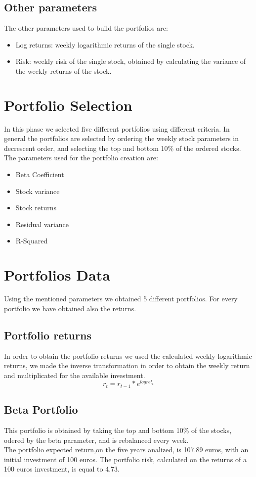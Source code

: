 \documentclass[12pt, a4paper, twocolumn]{article} %
\begin{document}
	\subsection{Other parameters}
	The other parameters used to build the portfolios are:
	\begin{itemize}
		\item Log returns: weekly logarithmic returns of the single stock.
		\item Risk: weekly risk of the single stock, obtained by calculating the variance of the weekly returns of the stock.
	\end{itemize}
	
	\section{Portfolio Selection}
	In this phase we selected five different portfolios using different criteria. In general the portfolios are selected by ordering the weekly stock parameters in decrescent order, and selecting the top and bottom 10\% of the ordered stocks.
	The parameters used for the portfolio creation are:
	\begin{itemize}
		\item Beta Coefficient
		\item Stock variance
		\item Stock returns
		\item Residual variance
		\item R-Squared
	\end{itemize}
	\section{Portfolios Data}
	Using the mentioned parameters we obtained 5 different portfolios. For every portfolio we have obtained also the returns.
	\subsection{Portfolio returns}
	In order to obtain the portfolio returns we used the calculated weekly logarithmic returns, we made the inverse transformation in order to obtain the weekly return and multiplicated for the available investment.
	\[
	r_{t}	= r_{t-1}*e^{logret_{t}}
	\]
	\subsection{Beta Portfolio}
	This portfolio is obtained by taking the top and bottom 10\% of the stocks, odered by the beta parameter, and is rebalanced every week.\\
	The portfolio expected return,on the five years analized, is 107.89 euros, with an initial investment of 100 euros. The portfolio risk, calculated on the returns of a 100 euros investment, is equal to 4.73.
\end{document}
